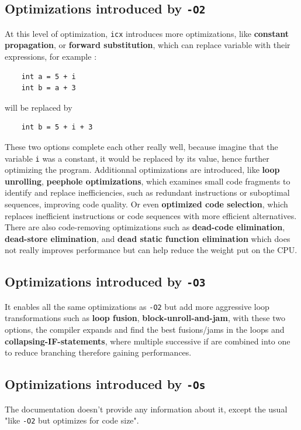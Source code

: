 \documentclass{rapport}
\newcommand{\icx}{\texttt{icx} }
\newcommand{\optitwo}{\texttt{-O2} }
\newcommand{\optithree}{\texttt{-O3} }
\newcommand{\optisize}{\texttt{-Os} }
\begin{document}
\subsection*{Optimizations introduced by \optitwo}
At this level of optimization, \icx introduces more optimizations, like \textbf{constant propagation}, or \textbf{forward substitution}, which can replace variable with their expressions, for example : 
\begin{verbatim}
    int a = 5 + i
    int b = a + 3
\end{verbatim}
will be replaced by
\begin{verbatim}
    int b = 5 + i + 3
\end{verbatim}
These two options complete each other really well, because imagine that the variable \texttt{i} was a constant, it would be replaced by its value, hence further optimizing the program.
\newline\newline
Additionnal optimizations are introduced, like \textbf{loop unrolling}, \textbf{peephole optimizations}, which examines small code fragments to identify and replace inefficiencies,
such as redundant instructions or suboptimal sequences, improving code quality. Or even \textbf{optimized code selection}, which replaces inefficient instructions or code sequences with 
more efficient alternatives.
\newline\newline
There are also code-removing optimizations such as \textbf{dead-code elimination}, \textbf{dead-store elimination}, and \textbf{dead static function elimination} which does not really improves performance but can help reduce the weight put on the CPU.

\subsection*{Optimizations introduced by \optithree}
It enables all the same optimizations as \optitwo but add more aggressive loop transformations such as \textbf{loop fusion}, \textbf{block-unroll-and-jam}, with these two options, the compiler expands and find the best fusions/jams in the loops and \textbf{collapsing-IF-statements}, where multiple successive if are combined into one to reduce branching therefore gaining performances.

\subsection*{Optimizations introduced by \optisize}
The documentation doesn't provide any information about it, except the usual "like \optitwo but optimizes for code size".
\end{document}
